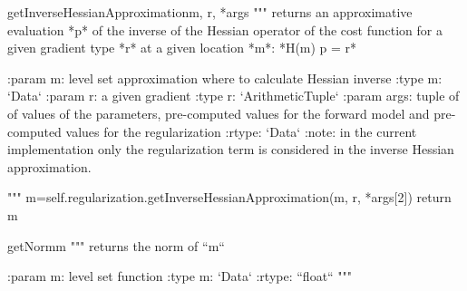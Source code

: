\begin{methoddesc}[InversionCostFunction]{getInverseHessianApproximation}{m, r, *args}
        """
        returns an approximative evaluation *p* of the inverse of the Hessian operator of the cost function
        for a given gradient type *r* at a given location *m*: *H(m) p = r*

        :param m: level set approximation where to calculate Hessian inverse
        :type m: `Data`
        :param r: a given gradient
        :type r: `ArithmeticTuple`
        :param args: tuple of of values of the parameters, pre-computed values for the forward model and
                 pre-computed values for the regularization
        :rtype: `Data`
        :note: in the current implementation only the regularization term is
               considered in the inverse Hessian approximation.

        """
        m=self.regularization.getInverseHessianApproximation(m, r, *args[2])
        return m

\end{methoddesc}
        
\begin{methoddesc}[InversionCostFunction]{getNorm}{m}
        """
        returns the norm of ``m``

        :param m: level set function
        :type m: `Data`
        :rtype: ``float``
        """

\end{methoddesc}

